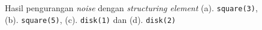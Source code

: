 \begin{figure}[h!]
\begin{center}
\caption{Hasil pengurangan \textit{noise} dengan \textit{structuring element} (a). \texttt{square(3)}, (b). \texttt{square(5)}, (c). \texttt{disk(1)} dan (d). \texttt{disk(2)}}
\label{fig:deNoise}
\end{center}
\end{figure}

